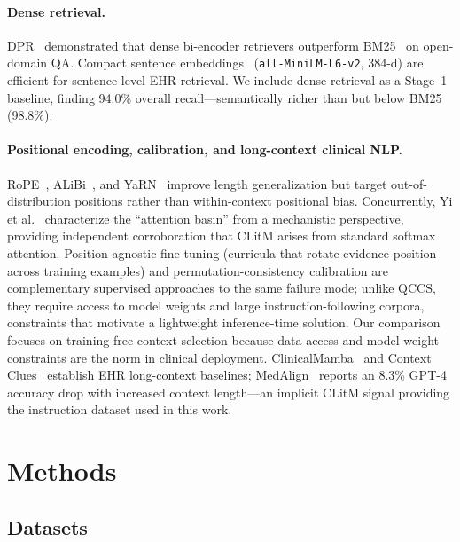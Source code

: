 \documentclass{article}
\begin{document}
\paragraph{Dense retrieval.}
DPR~\cite{karpukhin2020dpr} demonstrated that dense bi-encoder retrievers
outperform BM25~\cite{robertson2009bm25} on open-domain QA.
Compact sentence embeddings~\cite{reimers2019sentence} (\texttt{all-MiniLM-L6-v2},
384-d) are efficient for sentence-level EHR retrieval. We include dense retrieval
as a Stage~1 baseline, finding 94.0\% overall recall---semantically richer than
but below BM25 (98.8\%).

\paragraph{Positional encoding, calibration, and long-context clinical NLP.}
RoPE~\cite{su2021roformer}, ALiBi~\cite{press2022alibi}, and YaRN~\cite{peng2024yarn}
improve length generalization but target out-of-distribution positions rather than
within-context positional bias. Concurrently, Yi et al.~\cite{yi2025attentionbasin}
characterize the ``attention basin'' from a mechanistic perspective, providing
independent corroboration that CLitM arises from standard softmax attention.
Position-agnostic fine-tuning (curricula that rotate evidence position across training
examples) and permutation-consistency calibration are complementary supervised
approaches to the same failure mode; unlike QCCS, they require access to model weights
and large instruction-following corpora, constraints that motivate a lightweight
inference-time solution. Our comparison focuses on training-free context selection
because data-access and model-weight constraints are the norm in clinical deployment.
ClinicalMamba~\cite{yang2024clinicalmamba} and Context Clues~\cite{wornow2025context}
establish EHR long-context baselines; MedAlign~\cite{fleming2024medalign} reports an
8.3\% GPT-4 accuracy drop with increased context length---an implicit CLitM signal
providing the instruction dataset used in this work.

\section{Methods}
\label{sec:methods}

\subsection{Datasets}
\end{document}
